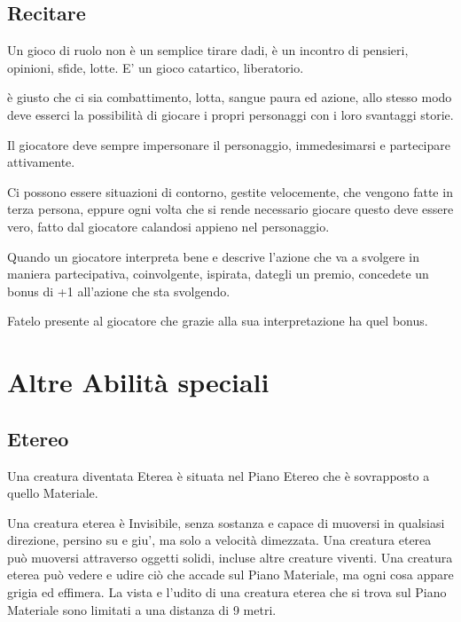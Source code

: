\documentclass[a4paper,11pt,twoside,openany]{book}
\begin{document}
\subsection{Recitare}

\label{recitare}

Un gioco di ruolo non è un semplice tirare dadi, è un incontro di pensieri, opinioni, sfide, lotte. E' un gioco catartico, liberatorio.

è giusto che ci sia combattimento, lotta, sangue paura ed azione, allo stesso modo deve esserci la possibilità di giocare i propri personaggi con i loro svantaggi storie.

Il giocatore deve sempre impersonare il personaggio, immedesimarsi e partecipare attivamente.

Ci possono essere situazioni di contorno, gestite velocemente, che vengono fatte in terza persona, eppure ogni volta che si rende necessario giocare questo deve essere vero, fatto dal giocatore calandosi appieno nel personaggio.

Quando un giocatore interpreta bene e descrive l'azione che va a svolgere in maniera partecipativa, coinvolgente, ispirata, dategli un premio, concedete un bonus di +1 all'azione che sta svolgendo.

Fatelo presente al giocatore che grazie alla sua interpretazione ha quel bonus.

\pagebreak

\section{Altre Abilità speciali}

\label{altre-abilita-speciali}

\subsection{Etereo}

\label{etereo}

Una creatura diventata Eterea è situata nel Piano Etereo che è sovrapposto a quello Materiale.

Una creatura eterea è Invisibile, senza sostanza e capace di muoversi in qualsiasi direzione, persino su e giu', ma solo a velocità dimezzata. Una creatura eterea può muoversi attraverso oggetti solidi, incluse altre creature viventi. Una creatura eterea può vedere e udire ciò che accade sul Piano Materiale, ma ogni cosa appare grigia ed effimera. La vista e l'udito di una creatura eterea che si trova sul Piano Materiale sono limitati a una distanza di 9 metri.
\end{document}
